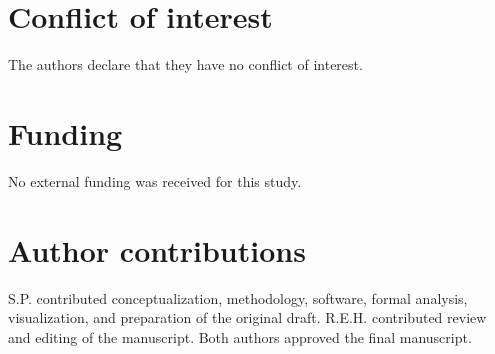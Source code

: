 \documentclass[12pt,a4paper]{article}
\theoremstyle{definition}
\theoremstyle{remark}
\begin{document}
\section*{Conflict of interest}
The authors declare that they have no conflict of interest.

\section*{Funding}
No external funding was received for this study.

\section*{Author contributions}
S.P. contributed conceptualization, methodology, software, formal analysis,
visualization, and preparation of the original draft. R.E.H. contributed
review and editing of the manuscript. Both authors approved the final
manuscript.



\end{document}
